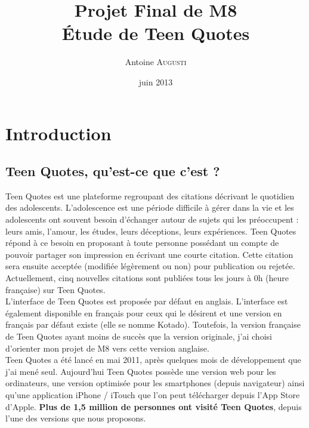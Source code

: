 \documentclass{report}
\title{
		Projet Final de M8\\
		Étude de Teen Quotes
}
\author{
	Antoine \textsc{Augusti} 
}
\date{juin 2013}
\begin{document}
	\maketitle

	\tableofcontents

	\chapter{Introduction}
	\section{Teen Quotes, qu'est-ce que c'est ?}
	Teen Quotes est une plateforme regroupant des citations décrivant le quotidien des adolescents. L'adolescence est une période difficile à gérer dans la vie et les adolescents ont souvent besoin d'échanger autour de sujets qui les préoccupent : leurs amis, l'amour, les études, leurs déceptions, leurs expériences. Teen Quotes répond à ce besoin en proposant à toute personne possédant un compte de pouvoir partager son impression en écrivant une courte citation. Cette citation sera ensuite acceptée (modifiée légèrement ou non) pour publication ou rejetée. Actuellement, cinq nouvelles citations sont publiées tous les jours à 0h (heure française) sur Teen Quotes.\\

	L'interface de Teen Quotes est proposée par défaut en anglais. L'interface est également disponible en français pour ceux qui le désirent et une version en français par défaut existe (elle se nomme Kotado). Toutefois, la version française de Teen Quotes ayant moins de succès que la version originale, j'ai choisi d'orienter mon projet de M8 vers cette version anglaise.\\

	Teen Quotes a été lancé en mai 2011, après quelques mois de développement que j'ai mené seul. Aujourd'hui Teen Quotes possède une version web pour les ordinateurs, une version optimisée pour les smartphones (depuis navigateur) ainsi qu'une application iPhone / iTouch que l'on peut télécharger depuis l'App Store d'Apple. \textbf{Plus de 1,5 million de personnes ont visité Teen Quotes}, depuis l'une des versions que nous proposons.\\
\end{document}

